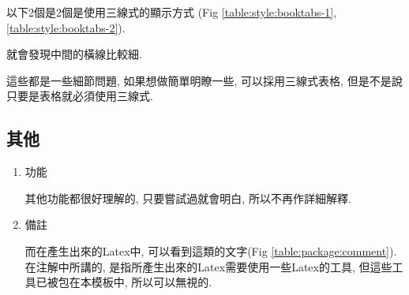   \newpage
  以下2個是2個是使用三線式的顯示方式 (Fig \ref{table:style:booktabs-1}, \ref{table:style:booktabs-2}).



  就會發現中間的橫線比較細.

  這些都是一些細節問題, 如果想做簡單明瞭一些, 可以採用三線式表格, 但是不是說只要是表格就必須使用三線式.



\newpage
\subsection{其他}

  \begin{enumerate}

    \item
    {
      功能

      其他功能都很好理解的, 只要嘗試過就會明白, 所以不再作詳細解釋.
    } %

    \item
    {
      備註

      而在產生出來的Latex中, 可以看到這類的文字(Fig \ref{table:package:comment}). 在注解中所講的, 是指所產生出來的Latex需要使用一些Latex的工具, 但這些工具已被包在本模板中, 所以可以無視的.

    } %
  \end{enumerate}

\EndChapter
